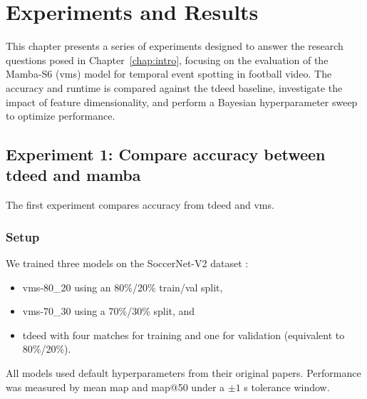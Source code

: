 \chapter{Experiments and Results}
\label{chap:experiments}
This chapter presents a series of experiments designed to answer the research questions posed in Chapter~\ref{chap:intro}, focusing on the evaluation of the Mamba-S6 (\acrshort{vms}) model for temporal event spotting in football video. The accuracy and runtime is compared against the \acrshort{tdeed} baseline, investigate the impact of feature dimensionality, and perform a Bayesian hyperparameter sweep to optimize performance.


\section{Experiment 1: Compare accuracy between \acrshort{tdeed} and mamba}
\label{sec:experiment1}
The first experiment compares accuracy from \acrshort{tdeed} and \acrshort{vms}. 

\subsection{Setup}
\label{ssec:ex1_setup}
We trained three models on the SoccerNet-V2 dataset \cite{deliege_soccernet-v2_dataset_2021}:  
\begin{itemize}
    \item \acrshort{vms}-80\_20 using an 80\%/20\% train/val split,  
    \item \acrshort{vms}-70\_30 using a 70\%/30\% split, and  
    \item \acrshort{tdeed} with four matches for training and one for validation (equivalent to 80\%/20\%).  
\end{itemize}

All models used default hyperparameters from their original papers. Performance was measured by mean \acrfull{map} and \acrshort{map}@50 under a \(\pm 1\) s tolerance window.



